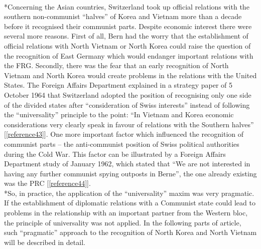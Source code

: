 \documentclass[a4paper]{article}
\begin{document}
\\*Concerning the Asian countries, Switzerland took up official relations with the southern non-communist “halves” of Korea and Vietnam more than a decade before it recognised their communist parts. Despite economic interest there were several more reasons. First of all, Bern had the worry that the establishment of official relations with North Vietnam or North Korea could raise the question of the recognition of East Germany which would endanger important relations with the FRG. Secondly, there was the fear that an early recognition of North Vietnam and North Korea would create problems in the relations with the United States. The Foreign Affairs Department explained in a strategy paper of 5 October 1964 that Switzerland adopted the position of recognising only one side of the divided states after “consideration of Swiss interests” instead of following the “universality” principle to the point: “In Vietnam and Korea economic considerations very clearly speak in favour of relations with the Southern halves” [\ref{reference43}]. One more important factor which influenced the recognition of communist parts – the anti-communist position of Swiss political authorities during the Cold War. This factor can be illustrated by a Foreign Affairs Department study of January 1962, which stated that “We are not interested in having any further communist spying outposts in Berne”, the one already existing was the PRC [\ref{reference44}].
\\*So, in practice, the application of the “universality” maxim was very pragmatic. If the establishment of diplomatic relations with a Communist state could lead to problems in the relationship with an important partner from the Western bloc, the principle of universality was not applied. In the following parts of article, such “pragmatic” approach to the recognition of North Korea and North Vietnam will be described in detail.
\end{document}
